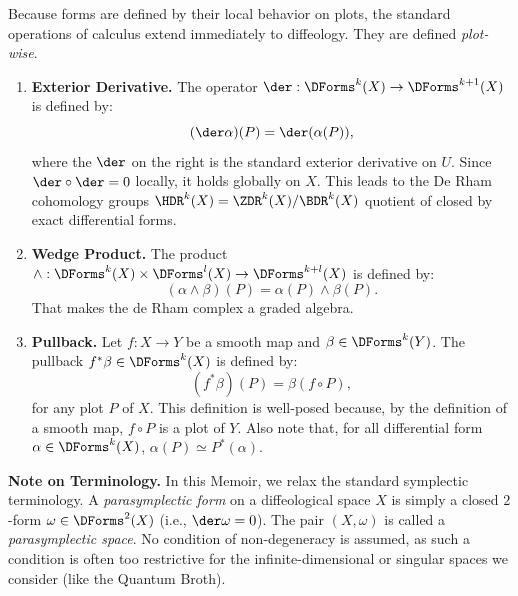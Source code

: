 \begin{article}
  Because forms are defined by their local behavior on plots,
  the standard operations of calculus extend immediately to diffeology.
  They are defined \emph{plot-wise}.
  
  \begin{enumerate}
    \item \textbf{Exterior Derivative.}
    The operator $\der: \DForms^k(X) \to \DForms^{k+1}(X)$ is defined by:
    \[
      (\der\alpha)(P) = \der(\alpha(P)),
      \]
    where the $\der$ on the right is the standard exterior derivative on $U$.
    Since $\der \circ \der = 0$ locally,
    it holds globally on $X$.
    This leads to the De Rham cohomology groups $\HDR^k(X) = \ZDR^k(X) / \BDR^k(X)$
    quotient of closed by exact differential forms.
    
    \item \textbf{Wedge Product.}
    The product $\wedge: \DForms^k(X) \times \DForms^l(X) \to \DForms^{k+l}(X)$ is defined by:
    \[
      (\alpha \wedge \beta)(P) = \alpha(P) \wedge \beta(P).
      \]
    That makes the de Rham complex a graded algebra.
    
    \item \textbf{Pullback.}
    Let $f: X \to Y$ be a smooth map and $\beta \in \DForms^k(Y)$.
    The pullback $f^*\beta \in \DForms^k(X)$ is defined by:
    \[
      (f^*\beta)(P) = \beta(f \circ P),
      \]
    for any plot $P$ of $X$.
    This definition is well-posed because,
    by the definition of a smooth map,
    $f \circ P$ is a plot of $Y$.
    Also note that,
    for all differential form $\alpha \in \DForms^k(X)$,
    $\alpha(P) \simeq P^*(\alpha)$.
  \end{enumerate}
  
  \textbf{Note on Terminology.}
  In this Memoir,
  we relax the standard symplectic terminology.
  A \emph{parasymplectic form} on a diffeological space $X$ is simply a closed $2$-form $\omega \in \DForms^2(X)$ (i.e., $\der\omega = 0$).
  The pair $(X, \omega)$ is called a \emph{parasymplectic space}.
  No condition of non-degeneracy is assumed,
  as such a condition is often too restrictive for the infinite-dimensional or singular spaces we consider (like the Quantum Broth).
\end{article}

